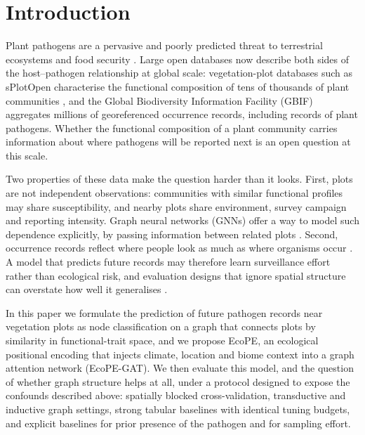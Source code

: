 \documentclass[a4paper,fleqn]{cas-sc}
\begin{document}
\section{Introduction}
\label{sec:intro}

Plant pathogens are a pervasive and poorly predicted threat to terrestrial ecosystems and food security \citep{bebber2014,fisher2012}. Large open databases now describe both sides of the host--pathogen relationship at global scale: vegetation-plot databases such as sPlotOpen characterise the functional composition of tens of thousands of plant communities \citep{sabatini2021}, and the Global Biodiversity Information Facility (GBIF) aggregates millions of georeferenced occurrence records, including records of plant pathogens. Whether the functional composition of a plant community carries information about where pathogens will be reported next is an open question at this scale.

Two properties of these data make the question harder than it looks. First, plots are not independent observations: communities with similar functional profiles may share susceptibility, and nearby plots share environment, survey campaign and reporting intensity. Graph neural networks (GNNs) offer a way to model such dependence explicitly, by passing information between related plots \citep{kipf2017,hamilton2017,velickovic2018}. Second, occurrence records reflect where people look as much as where organisms occur \citep{beck2014,phillips2009}. A model that predicts future records may therefore learn surveillance effort rather than ecological risk, and evaluation designs that ignore spatial structure can overstate how well it generalises \citep{roberts2017,ploton2020}.

In this paper we formulate the prediction of future pathogen records near vegetation plots as node classification on a graph that connects plots by similarity in functional-trait space, and we propose EcoPE, an ecological positional encoding that injects climate, location and biome context into a graph attention network (EcoPE-GAT). We then evaluate this model, and the question of whether graph structure helps at all, under a protocol designed to expose the confounds described above: spatially blocked cross-validation, transductive and inductive graph settings, strong tabular baselines with identical tuning budgets, and explicit baselines for prior presence of the pathogen and for sampling effort.
\end{document}
